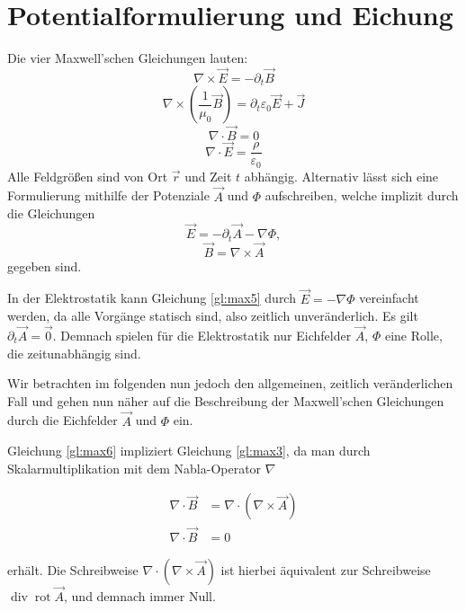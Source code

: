 \section{Potentialformulierung und Eichung}
Die vier Maxwell'schen Gleichungen lauten:
\begin{equation}
\label{gl:max1}
\nabla \times \vec{E} = -\partial_t\vec{B}
\end{equation}
\begin{equation}
\label{gl:max2}
\nabla \times \left(\frac{1}{\mu_0}\vec{B}\right) = \partial_t\varepsilon_0\vec{E} + \vec{J}
\end{equation}
\begin{equation}
\label{gl:max3}
\nabla \cdot \vec{B} = 0
\end{equation}
\begin{equation}
\label{gl:max4}
\nabla \cdot \vec{E} = \frac{\rho}{\varepsilon_0}
\end{equation}
Alle Feldgrößen sind von Ort $\vec{r}$ und Zeit $t$ abhängig. Alternativ lässt sich eine Formulierung mithilfe der Potenziale $\vec{A}$ und $\Phi$ aufschreiben, welche implizit durch die Gleichungen
\begin{equation}
\label{gl:max5}
\vec{E} = -\partial_t\vec{A} - \nabla\Phi,
\end{equation}
\begin{equation}
\label{gl:max6}
\vec{B} = \nabla\times\vec{A}
\end{equation}
gegeben sind.

In der Elektrostatik kann Gleichung \ref{gl:max5} durch $\vec{E} = - \nabla\Phi$ vereinfacht werden, da alle Vorgänge statisch sind, also zeitlich unveränderlich. Es gilt $\partial_t\vec{A} = \vec{0}$. Demnach spielen für die Elektrostatik nur Eichfelder $\vec{A}$, $\Phi$ eine Rolle, die zeitunabhängig sind.

Wir betrachten im folgenden nun jedoch den allgemeinen, zeitlich veränderlichen Fall und gehen nun näher auf die Beschreibung der Maxwell'schen Gleichungen durch die Eichfelder $\vec{A}$ und $\Phi$ ein.

Gleichung \ref{gl:max6} impliziert Gleichung \ref{gl:max3}, da man durch Skalarmultiplikation mit dem Nabla-Operator $\nabla$

\begin{align*}
\nabla \cdot \vec{B} &= \nabla \cdot (\nabla\times\vec{A}) \\
\nabla \cdot \vec{B} &= 0
\end{align*}

erhält. Die Schreibweise $\nabla \cdot (\nabla\times\vec{A})$ ist hierbei äquivalent zur Schreibweise $\operatorname{div} \operatorname{rot} \vec{A}$, und demnach immer Null.

